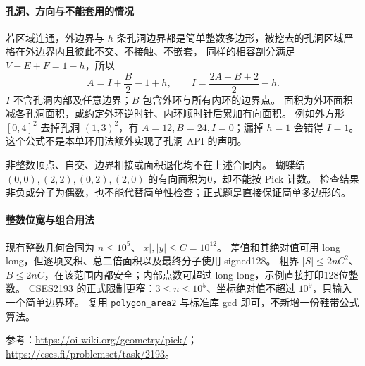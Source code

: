 \newpage
\paragraph{孔洞、方向与不能套用的情况}
若区域连通，外边界与 $h$ 条孔洞边界都是简单整数多边形，被挖去的孔洞区域严格在外边界内且彼此不交、不接触、不嵌套，
同样的相容剖分满足 $V-E+F=1-h$，所以
\[
A=I+\frac B2-1+h,\qquad I=\frac{2A-B+2}{2}-h.
\]
$I$ 不含孔洞内部及任意边界；$B$ 包含外环与所有内环的边界点。
面积为外环面积减各孔洞面积，或约定外环逆时针、内环顺时针后累加有向面积。
例如外方形 $[0,4]^2$ 去掉孔洞 $(1,3)^2$，有 $A=12,B=24,I=0$；漏掉 $h=1$ 会错得 $I=1$。
这个公式不是本单环用法额外实现了孔洞 API 的声明。

非整数顶点、自交、边界相接或面积退化均不在上述合同内。
蝴蝶结 $(0,0),(2,2),(0,2),(2,0)$ 的有向面积为0，却不能按 Pick 计数。
检查结果非负或分子为偶数，也不能代替简单性检查；正式题是直接保证简单多边形的。

\paragraph{整数位宽与组合用法}
现有整数几何合同为 $n\le10^5$、$|x|,|y|\le C=10^{12}$。
差值和其绝对值可用 long long，但逐项叉积、总二倍面积以及最终分子使用 signed128。
粗界 $|S|\le2nC^2$、$B\le2nC$，在该范围内都安全；内部点数可超过 long long，示例直接打印128位整数。
CSES2193 的正式限制更窄：$3\le n\le10^5$、坐标绝对值不超过 $10^9$，只输入一个简单边界环。
复用 \texttt{polygon\_area2} 与标准库 gcd 即可，不新增一份鞋带公式算法。

参考：\url{https://oi-wiki.org/geometry/pick/}；\url{https://cses.fi/problemset/task/2193}。

